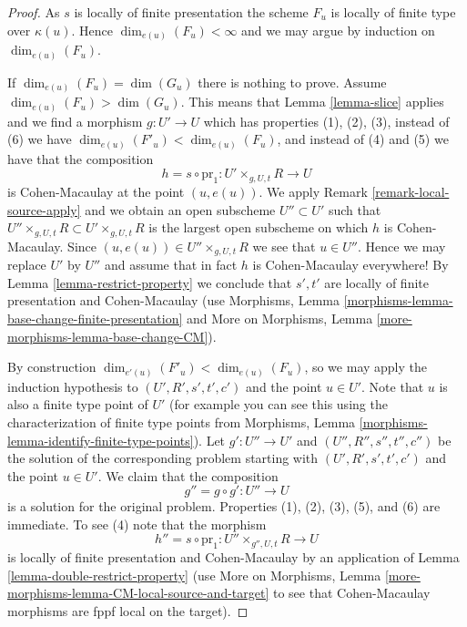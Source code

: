 \begin{proof}
As $s$ is locally of finite presentation the scheme $F_u$ is
locally of finite type over $\kappa(u)$. Hence
$\dim_{e(u)}(F_u) < \infty$ and we may argue by induction on
$\dim_{e(u)}(F_u)$.

\medskip\noindent
If $\dim_{e(u)}(F_u) = \dim(G_u)$ there is nothing to prove.
Assume $\dim_{e(u)}(F_u) > \dim(G_u)$. This means that
Lemma \ref{lemma-slice}
applies and we find a morphism $g : U' \to U$ which has
properties (1), (2), (3), instead of (6) we have
$\dim_{e(u)}(F'_u) < \dim_{e(u)}(F_u)$,
and instead of (4) and (5) we have that the composition
$$
h = s \circ \text{pr}_1 : U' \times_{g, U, t} R \longrightarrow U
$$
is Cohen-Macaulay at the point $(u, e(u))$. We apply
Remark \ref{remark-local-source-apply}
and we obtain an open subscheme $U'' \subset U'$ such that
$U'' \times_{g, U, t} R \subset U' \times_{g, U, t} R$
is the largest open subscheme on which $h$ is Cohen-Macaulay.
Since $(u, e(u)) \in U'' \times_{g, U, t} R$ we see that $u \in U''$.
Hence we may replace $U'$ by $U''$ and assume that in fact $h$ is
Cohen-Macaulay everywhere! By
Lemma \ref{lemma-restrict-property}
we conclude that $s', t'$ are locally of finite
presentation and Cohen-Macaulay (use
Morphisms, Lemma \ref{morphisms-lemma-base-change-finite-presentation}
and
More on Morphisms, Lemma \ref{more-morphisms-lemma-base-change-CM}).

\medskip\noindent
By construction $\dim_{e'(u)}(F'_u) < \dim_{e(u)}(F_u)$,
so we may apply the induction hypothesis to $(U', R', s', t', c')$
and the point $u \in U'$. Note that $u$ is also a finite type point
of $U'$ (for example you can see this using the characterization of
finite type points from
Morphisms, Lemma \ref{morphisms-lemma-identify-finite-type-points}).
Let $g' : U'' \to U'$ and $(U'', R'', s'', t'', c'')$ be the solution
of the corresponding problem starting with $(U', R', s', t', c')$
and the point $u \in U'$. We claim that the composition
$$
g'' = g \circ g' : U'' \longrightarrow U
$$
is a solution for the original problem. Properties (1), (2), (3), (5),
and (6) are immediate. To see (4) note that the morphism
$$
h'' = s \circ \text{pr}_1 : U'' \times_{g'', U, t} R \longrightarrow U
$$
is locally of finite presentation and Cohen-Macaulay by an application of
Lemma \ref{lemma-double-restrict-property}
(use
More on Morphisms, Lemma \ref{more-morphisms-lemma-CM-local-source-and-target}
to see that Cohen-Macaulay morphisms are fppf local on the target).
\end{proof}

